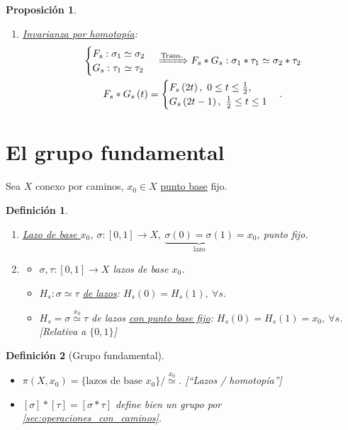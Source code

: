 \documentclass[10pt,a4paper,openright]{book}
\theoremstyle{break}
\newtheorem*{defi}{Definición}
\newtheorem*{prop}{Proposición}
\begin{document}
\begin{prop}
\begin{enumerate}
    \item \underline{Invarianza por homotopía}: 
    \begin{gather*}
        \begin{cases}
            F_s: \sigma_1 \simeq \sigma_2\\
            G_s: \tau_1 \simeq \tau_2
        \end{cases} \xRightarrow{\text{Trans.}} F_s * G_s: \sigma_1 * \tau_1 \simeq \sigma_2 * \tau_2\\
        F_s * G_s\left( t \right) = \begin{cases}
            F_s\left( 2t \right),\ 0 \le t \le \frac{1}{2},\\
            G_s\left( 2t - 1 \right),\ \frac{1}{2} \le t \le 1
        \end{cases} 
    .\end{gather*}

\end{enumerate}
\end{prop}

\section{El grupo fundamental}%
\label{sec:el_grupo_fundamental}
Sea $X$ conexo por caminos, $x_0 \in X$ \underline{punto base} fijo.
\begin{defi}
\begin{enumerate}
    \item \underline{Lazo de base $x_0$}, $\sigma: \left[ 0, 1 \right] \rightarrow X,\ \underbrace{\sigma\left( 0 \right) = \sigma\left( 1 \right)}_{\text{lazo}} = x_0$, punto fijo.

    \item \begin{itemize}
        \item $\sigma, \tau: \left[ 0, 1 \right] \rightarrow X$ lazos de base $x_0$.
        \item $H_s: \sigma \simeq \tau$ \underline{de lazos}: $H_s\left( 0 \right) = H_s\left( 1 \right),\ \forall s$.
        \item $H_s = \sigma \stackrel{x_0}{\simeq} \tau$ de lazos \underline{con punto base fijo}: $H_s\left( 0 \right) = H_s\left( 1 \right) = x_0,\ \forall s$. [Relativa a $\{0, 1\}$]
    \end{itemize}
\end{enumerate}
\end{defi}
\begin{defi}[Grupo fundamental]
\begin{itemize}
    \item $\pi\left( X, x_0 \right) = \{\text{lazos de base } x_0\} / \stackrel{x_0}{\simeq}$. [``Lazos / homotopía'']
    \item $\left[ \sigma \right] * \left[ \tau \right] = \left[ \sigma * \tau \right]$ define bien un grupo por \ref{sec:operaciones_con_caminos}.
\end{itemize}
\end{defi}
\end{document}
